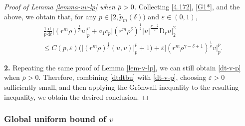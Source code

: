 \documentclass[11pt,reqno]{amsart}
\numberwithin{rk}{section}
\numberwithin{prop}{section}
\numberwithin{mydef}{section}
\numberwithin{lem}{section}
\numberwithin{equation}{section}
\numberwithin{thm}{section}
\begin{document}
\begin{proof}[Proof of Lemma \ref{lemma-uv-lp} when $\bar{\rho}>0$]
Collecting \eqref{4.172}, \eqref{G1*}, and the above, we obtain that, for any $p\in [2,\tilde{p}_m(\delta))$ and $\varepsilon\in (0,1)$,
\begin{equation}\label{dtdtbu}
\begin{aligned}
&\,\frac{1}{p}\frac{\mathrm{d}}{\mathrm{d}t}\big|(r^m\rho)^\frac{1}{p}u\big|_p^p+ a_1 c_p\big|(r^m \rho^\delta)^\frac{1}{2} |u|^\frac{p-2}{2} \mathrm{D}_r u\big|_2^2 \\
&\leq C(p,\varepsilon)\big(\big|(r^m\rho)^\frac{1}{p}(u,v)\big|_p^p+1\big) +\varepsilon \big|(r^m\rho^{\gamma-\delta+1})^\frac{1}{p}v\big|_p^p.   
\end{aligned}
\end{equation}



\smallskip
\textbf{2.} Repeating the same proof of Lemma \ref{lem-v-lp}, we can still obtain \eqref{dt-v-p} when $\bar{\rho}>0$. Therefore, combining \eqref{dtdtbu} with \eqref{dt-v-p},  choosing  $\varepsilon>0$ sufficiently small, and then applying the Gr\"onwall inequality to the resulting inequality, we obtain the desired conclusion.
\end{proof}

\subsubsection{Global uniform bound of $v$}\label{subsub2}
\end{document}
